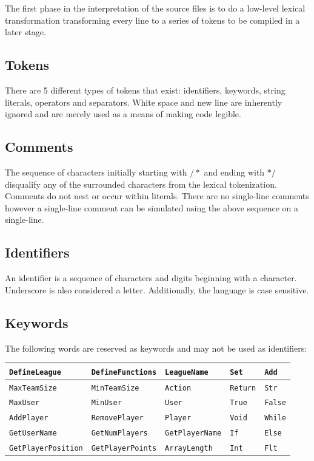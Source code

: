 \documentclass[12pt]{report}
\begin{document}
The first phase in the interpretation of the source files is to do a low-level lexical transformation transforming every line to a series of tokens to be compiled in a later stage.

\subsection{Tokens}

There are 5 different types of tokens that exist: identifiers, keywords, string literals, operators and separators. White space and new line are inherently ignored and are merely used as a means of making code legible.

\subsection{Comments}

The sequence of characters initially starting with $/*$ and ending with $*/$ disqualify any of the surrounded characters from the lexical tokenization. Comments do not nest or occur within literals. There are no single-line comments however a single-line comment can be simulated using the above sequence on a single-line.

\subsection{Identifiers}

An identifier is a sequence of characters and digits beginning with a character. Underscore is also considered a letter. Additionally, the language is case sensitive.

\subsection{Keywords}

The following words are reserved as keywords and may not be used as identifiers:

\begin{center}
\begin{tabular}{ | l | l | l | l | l | }
\hline
\texttt{DefineLeague} & \texttt{DefineFunctions} & \texttt{LeagueName} & \texttt{Set} & \texttt{Add}\\
\hline
\texttt{MaxTeamSize} & \texttt{MinTeamSize} & \texttt{Action} & \texttt{Return} & \texttt{Str}\\
\hline
\texttt{MaxUser} & \texttt{MinUser} & \texttt{User} & \texttt{True} & \texttt{False} \\
\hline
\texttt{AddPlayer} & \texttt{RemovePlayer} & \texttt{Player} & \texttt{Void} & \texttt{While} \\
\hline
\texttt{GetUserName} & \texttt{GetNumPlayers} & \texttt{GetPlayerName} & \texttt{If} & \texttt{Else} \\
\hline
\texttt{GetPlayerPosition} & \texttt{GetPlayerPoints} & \texttt{ArrayLength} & \texttt{Int} & \texttt{Flt}\\
\hline
\end{tabular}
\end{center}
\end{document}
